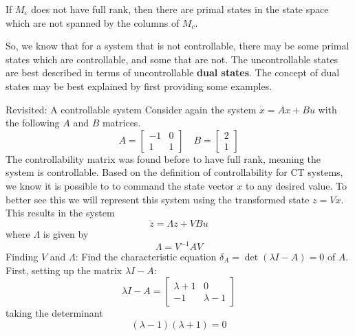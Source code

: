 If $M_{c}$ does not have full rank, then there are primal states in the state space which are not spanned by the columns of $M_{c}$.

So, we know that for a system that is not controllable, there may be some primal states which are controllable, and some that are not.
The uncontrollable states are best described in terms of uncontrollable \textbf{dual states}.
The concept of dual states may be best explained by first providing some examples.

\begin{example}
  Revisited: A controllable system Consider again the system $\dot{x}=Ax+Bu$ with the following $A$ and $B$ matrices.
  \begin{equation*}
    A=
    \left[
      \begin{array}{cc}
      -1 & 0 \\
      1 & 1
      \end{array}
    \right]
    \quad B=
    \left[
      \begin{array}{c}
        2 \\
        1
      \end{array}
    \right]
  \end{equation*}
  The controllability matrix was found before to have full rank, meaning the system is controllable.
  Based on the definition of controllability for CT systems, we know it is possible to to command the state vector $x$ to any desired value.
  To better see this we will represent this system using the transformed state $z=Vx$.
  This results in the system
  \begin{equation*}
    \dot{z}=\Lambda z+VBu
  \end{equation*}
  where $\Lambda$ is given by
  \begin{equation*}
    \Lambda=V^{-1}AV
  \end{equation*}
  Finding $V$ and $\Lambda$: Find the characteristic equation $\delta_{A}=\det(\lambda I-A)=0$ of $A$.
  First, setting up the matrix $\lambda I-A$:
  \begin{equation*}
    \lambda I-A=
    \left[
      \begin{array}{cc}
        \lambda+1 & 0 \\
        -1 & \lambda-1
      \end{array}
    \right]
  \end{equation*}
  taking the determinant
  \begin{equation*}
    (\lambda-1)(\lambda+1)=0
  \end{equation*}

\end{example}
